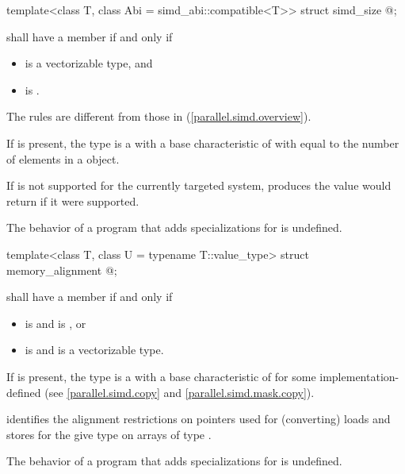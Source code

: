 \begin{itemdecl}
template<class T, class Abi = simd_abi::compatible<T>> struct simd_size { @\seebelow@ };
\end{itemdecl}

\begin{itemdescr}
\pnum
{} shall have a member  if and only if
\begin{itemize}
  \item {} is a vectorizable type, and
  \item {} is .
\end{itemize}
\begin{note}
  The rules are different from those in (\ref{parallel.simd.overview}).
\end{note}

\pnum
If  is present, the type  is a  with a base characteristic of  with  equal to the number of elements in a  object. \begin{note}If  is not supported for the currently targeted system,  produces the value  would return if it were supported.\end{note}

\pnum
The behavior of a program that adds specializations for  is undefined.
\end{itemdescr}

\begin{itemdecl}
template<class T, class U = typename T::value_type> struct memory_alignment { @\seebelow@ };
\end{itemdecl}

\begin{itemdescr}
\pnum
{} shall have a member  if and only if
\begin{itemize}
  \item {} is  and  is , or
  \item {} is  and  is a vectorizable type.
\end{itemize}

\pnum
If  is present, the type  is a  with a base characteristic of  for some implementation-defined  (see \ref{parallel.simd.copy} and \ref{parallel.simd.mask.copy}). \begin{note} identifies the alignment restrictions on pointers used for (converting) loads and stores for the give type  on arrays of type .\end{note}

\pnum
The behavior of a program that adds specializations for  is undefined.
\end{itemdescr}

